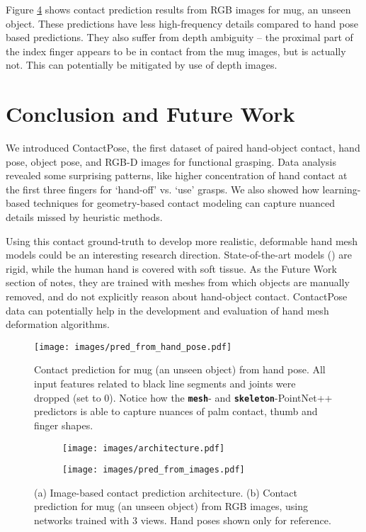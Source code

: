 \documentclass[runningheads]{llncs}
\begin{document}
Figure \ref{fig:pred_from_images} shows contact prediction results from RGB images for mug, an unseen object. These predictions have less high-frequency details compared to hand pose based predictions. They also suffer from depth ambiguity -- the proximal part of the index finger appears to be in contact from the mug images, but is actually not. This can potentially be mitigated by use of depth images. \section{Conclusion and Future Work}
We introduced ContactPose, the first dataset of paired hand-object contact, hand pose, object pose, and RGB-D images for functional grasping. Data analysis revealed some surprising patterns, like higher concentration of hand contact at the first three fingers for `hand-off' vs. `use' grasps. We also showed how learning-based techniques for geometry-based contact modeling can capture nuanced details missed by heuristic methods.

Using this contact ground-truth to develop more realistic, deformable hand mesh models could be an interesting research direction. State-of-the-art models (\eg \cite{romero2017embodied,joo2018total}) are rigid, while the human hand is covered with soft tissue. As the Future Work section of \cite{romero2017embodied} notes, they are trained with meshes from which objects are manually removed, and do not explicitly reason about hand-object contact. ContactPose data can potentially help in the development and evaluation of hand mesh deformation algorithms.

\begin{figure}
    \texttt{[image: images/pred\_from\_hand\_pose.pdf]}
    \caption{Contact prediction for mug (an unseen object) from hand pose. All input features related to black line segments and joints were dropped (set to 0). Notice how the \textbf{\texttt{mesh}}- and \textbf{\texttt{skeleton}}-PointNet++ predictors is able to capture nuances of palm contact, thumb and finger shapes.}
    \label{fig:pred_from_hand_pose}
  \end{figure}
  
\begin{figure}
\begin{subfigure}[b]{0.63\textwidth}
    \texttt{[image: images/architecture.pdf]}
\caption{}
\label{fig:image_pred_architecture} 
\end{subfigure}
\begin{subfigure}[b]{0.35\textwidth}
    \texttt{[image: images/pred\_from\_images.pdf]}
\caption{}
\label{fig:pred_from_images} 
\end{subfigure}
\caption{(a) Image-based contact prediction architecture. (b) Contact prediction for mug (an unseen object) from RGB images, using networks trained with 3 views. Hand poses shown only for reference.}
\end{figure}
\end{document}
